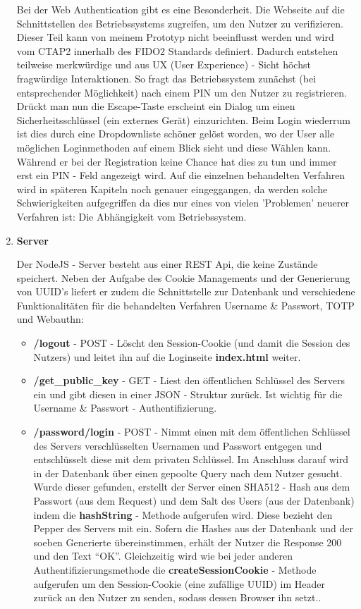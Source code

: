 \begin{enumerate}
Bei der Web Authentication gibt es eine Besonderheit. Die Webseite auf die Schnittstellen des Betriebssystems zugreifen, um den Nutzer zu verifizieren. Dieser Teil kann von meinem Prototyp nicht beeinflusst werden und wird vom CTAP2 innerhalb des FIDO2 Standards definiert. Dadurch entstehen teilweise merkwürdige und aus UX (User Experience) - Sicht höchst fragwürdige Interaktionen. So fragt das Betriebssystem zunächst (bei entsprechender Möglichkeit) nach einem PIN um den Nutzer zu registrieren. Drückt man nun die Escape-Taste erscheint ein Dialog um einen Sicherheitsschlüssel (ein externes Gerät) einzurichten. Beim Login wiederrum ist dies durch eine Dropdownliste schöner gelöst worden, wo der User alle möglichen Loginmethoden auf einem Blick sieht und diese Wählen kann. Während er bei der Registration keine Chance hat dies zu tun und immer erst ein PIN - Feld angezeigt wird. Auf die einzelnen behandelten Verfahren wird in späteren Kapiteln noch genauer eingeggangen, da werden solche Schwierigkeiten aufgegriffen da dies nur eines von vielen 'Problemen' neuerer Verfahren ist: Die Abhängigkeit vom Betriebssystem.

\item \textbf{Server}

Der NodeJS - Server besteht aus einer REST Api, die keine Zustände speichert. Neben der Aufgabe des Cookie Managements und der Generierung von UUID's liefert er zudem die Schnittstelle zur Datenbank und verschiedene Funktionalitäten für die behandelten Verfahren Username \& Passwort, TOTP und Webauthn:

\begin{itemize}
 \item \textbf{/logout} - POST - Löscht den Session-Cookie (und damit die Session des Nutzers) und leitet ihn auf die Loginseite \textbf{index.html} weiter.

 \item \textbf{/get\_public\_key} - GET - Liest den öffentlichen Schlüssel des Servers ein und gibt diesen in einer JSON - Struktur zurück. Ist wichtig für die Username \& Passwort - Authentifizierung.

 \item \textbf{/password/login} - POST - Nimmt einen mit dem öffentlichen Schlüssel des Servers verschlüsselten Usernamen und Passwort entgegen und entschlüsselt diese mit dem privaten Schlüssel. Im Anschluss darauf wird in der Datenbank über einen gepoolte Query nach dem Nutzer gesucht. Wurde dieser gefunden, erstellt der Server einen SHA512 - Hash aus dem Passwort (aus dem Request) und dem Salt des Users (aus der Datenbank) indem die \textbf{hashString} - Methode aufgerufen wird. Diese bezieht den Pepper des Servers mit ein. Sofern die Hashes aus der Datenbank und der soeben Generierte übereinstimmen, erhält der Nutzer die Response 200 und den Text ``OK''. Gleichzeitig wird wie bei jeder anderen Authentifizierungsmethode die \textbf{createSessionCookie} - Methode aufgerufen um den Session-Cookie (eine zufällige UUID) im Header zurück an den Nutzer zu senden, sodass dessen Browser ihn setzt..
 \newpage
 

\end{itemize}
\end{enumerate}
